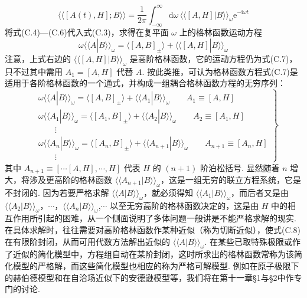 \begin{equation}
\langle\langle[A(t),H];B\rangle\rangle=\frac{1}{2\pi}
\int_{-\infty}^{\infty}\mathrm{d}\omega\,
\langle\langle[A,H]|B\rangle\rangle_{\omega}
\mathrm{e}^{-\mathrm{i}\omega t}
\end{equation}
将式(C.4)—(C.6)代入式(C.3)，求得在复平面 $\omega$ 上的格林函数运动方程
\begin{equation}
\omega\langle\langle A|B\rangle\rangle_{\omega}
=\langle[A,B]_{\pm}\rangle
+\langle\langle[A,H]|B\rangle\rangle_{\omega}
\end{equation}
注意，上式右边的 $\langle\langle[A,H]|B\rangle\rangle_{\omega}$ 是高阶格林函数，它的运动方程仍为式(C.7)，只不过其中需用 $A_{1}=[A,H]$ 代替 $A$. 按此类推，可认为格林函数方程式(C.7)是适用于各阶格林函数的一个通式，并构成一组耦合格林函数方程的无穷序列：
\begin{equation}
\left.
\begin{aligned}
&\omega\langle\langle A|B\rangle\rangle_{\omega}
=\langle[A,B]_{\pm}\rangle
+\langle\langle A_{1}|B\rangle\rangle_{\omega}
\qquad A_{1}\equiv[A,H]\\
&\omega\langle\langle A_{1}|B\rangle\rangle_{\omega}
=\langle[A_{1},B]_{\pm}\rangle
+\langle\langle A_{2}|B\rangle\rangle_{\omega}
\qquad A_{2}\equiv[A_{1},H]\\
&\qquad\vdots\\
&\omega\langle\langle A_{n}|B\rangle\rangle_{\omega}
=\langle[A_{n},B]_{\pm}\rangle
+\langle\langle A_{n+1}|B\rangle\rangle_{\omega}
\qquad A_{n+1}\equiv[A_{n},H]\\
&\qquad\vdots
\end{aligned}
\right\}
\end{equation}
其中 $A_{n+1}\equiv\left[\cdots\left[A,H\right],\cdots,H\right]$ 代表 $H$ 的 $(n+1)$ 阶泊松括号. 显然随着 $n$ 增大，将涉及更高阶的格林函数 $\langle\langle A_{n+1}|B\rangle\rangle_{\omega}$，这是一组无穷的联立方程系统，它是不封闭的. 因为若要严格求解 $\langle\langle A|B\rangle\rangle_{\omega}$，就必须得知 $\langle\langle A_{1}|B\rangle\rangle_{\omega}$，而后者又是由 $\langle\langle A_{2}|B\rangle\rangle_{\omega}$，$\cdots$，$\langle\langle A_{n}|B\rangle\rangle_{\omega}$,$\cdots$ 以至无穷高阶的格林函数决定的，这是由 $H$ 中的相互作用所引起的困难，从一个侧面说明了多体问题一般讲是不能严格求解的现实. 在具体求解时，往往需要对高阶格林函数作某种近似（称为切断近似），使式(C.8)在有限阶封闭，从而可用代数方法解出近似的 $\langle\langle A|B\rangle\rangle_{\omega}$. 在某些已取特殊极限或作了近似的简化模型中，方程组自动在某阶封闭，这时所求出的格林函数常称为该简化模型的严格解，而这些简化模型也相应的称为严格可解模型. 例如在原子极限下的赫伯德模型和在自洽场近似下的安德逊模型等，我们将在第十一章§1与§2中作专门的讨论.


